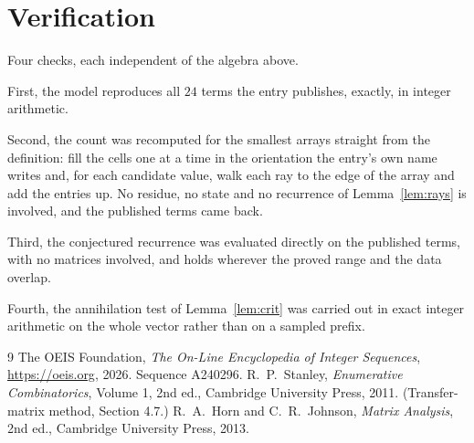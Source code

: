 \documentclass[11pt,a4paper]{article}
\theoremstyle{plain}
\theoremstyle{definition}
\begin{document}
\section{Verification}

Four checks, each independent of the algebra above.

First, the model reproduces all $24$ terms the entry publishes, exactly, in integer
arithmetic.

Second, the count was recomputed for the smallest arrays straight from the definition: fill the
cells one at a time in the orientation the entry's own name writes and, for each candidate
value, walk each ray to the edge of the array and add the entries up. No residue, no state and
no recurrence of Lemma~\ref{lem:rays} is involved, and the published terms came back.

Third, the conjectured recurrence was evaluated directly on the published terms, with no
matrices involved, and holds wherever the proved range and the data overlap.

Fourth, the annihilation test of Lemma~\ref{lem:crit} was carried out in exact integer
arithmetic on the whole vector rather than on a sampled prefix.

\begin{thebibliography}{9}
 The OEIS Foundation, \emph{The On-Line Encyclopedia of Integer
Sequences}, \url{https://oeis.org}, 2026. Sequence A240296.
 R.~P.~Stanley, \emph{Enumerative Combinatorics}, Volume 1, 2nd ed.,
Cambridge University Press, 2011. (Transfer-matrix method, Section 4.7.)
 R.~A.~Horn and C.~R.~Johnson, \emph{Matrix Analysis}, 2nd ed., Cambridge
University Press, 2013.
\end{thebibliography}
\end{document}
